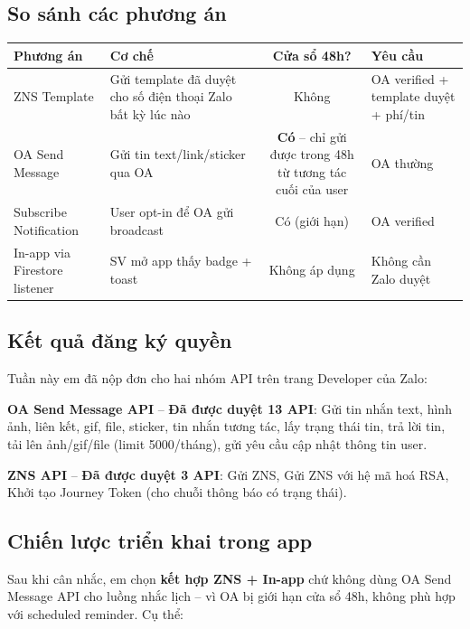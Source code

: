 \documentclass{article}
\begin{document}
\subsection{So sánh các phương án}

\begin{center}
\begin{tabularx}{\textwidth}{@{}l X c l@{}}
\toprule
\textbf{Phương án} & \textbf{Cơ chế} & \textbf{Cửa sổ 48h?} & \textbf{Yêu cầu} \\
\midrule
ZNS Template & Gửi template đã duyệt cho số điện thoại Zalo bất kỳ lúc nào & Không & OA verified + template duyệt + phí/tin \\
\addlinespace
OA Send Message & Gửi tin text/link/sticker qua OA & \textbf{Có} -- chỉ gửi được trong 48h từ tương tác cuối của user & OA thường \\
\addlinespace
Subscribe Notification & User opt-in để OA gửi broadcast & Có (giới hạn) & OA verified \\
\addlinespace
In-app via Firestore listener & SV mở app thấy badge + toast & Không áp dụng & Không cần Zalo duyệt \\
\bottomrule
\end{tabularx}
\end{center}

\subsection{Kết quả đăng ký quyền}

Tuần này em đã nộp đơn cho hai nhóm API trên trang Developer của Zalo:

\textbf{OA Send Message API} -- \textcolor{statusgreen}{\textbf{Đã được duyệt 13 API}}: Gửi tin nhắn text, hình ảnh, liên kết, gif, file, sticker, tin nhắn tương tác, lấy trạng thái tin, trả lời tin, tải lên ảnh/gif/file (limit 5000/tháng), gửi yêu cầu cập nhật thông tin user.

\textbf{ZNS API} -- \textcolor{statusgreen}{\textbf{Đã được duyệt 3 API}}: Gửi ZNS, Gửi ZNS với hệ mã hoá RSA, Khởi tạo Journey Token (cho chuỗi thông báo có trạng thái).

\subsection{Chiến lược triển khai trong app}

Sau khi cân nhắc, em chọn \textbf{kết hợp ZNS + In-app} chứ không dùng OA Send Message API cho luồng nhắc lịch -- vì OA bị giới hạn cửa sổ 48h, không phù hợp với scheduled reminder. Cụ thể:
\end{document}
